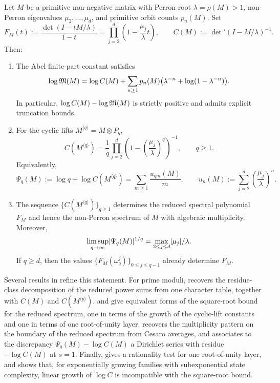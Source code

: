 \begin{theorem}\label{thm:intro-finite-part-fingerprint}
Let \(M\) be a primitive non-negative matrix with Perron root
\(\lambda=\rho(M)>1\), non-Perron eigenvalues
\(\mu_2,\dots,\mu_d\), and primitive orbit counts \(p_n(M)\). Set
\[
  F_M(t):=\frac{\det(I-tM/\lambda)}{1-t}
  =\prod_{j=2}^d\left(1-\frac{\mu_j}{\lambda}t\right),
  \qquad
  C(M):=\det\nolimits'(I-M/\lambda)^{-1}.
\]
Then:
\begin{enumerate}[label=\textup{(\roman*)}]
  \item The Abel finite-part constant satisfies
  \[
    \log\mathfrak{M}(M)
    =\log C(M)
     +\sum_{n\ge 1}p_n(M)\bigl(\lambda^{-n}+\log(1-\lambda^{-n})\bigr).
  \]
  In particular, \(\log C(M)-\log\mathfrak{M}(M)\) is strictly positive and
  admits explicit truncation bounds.

  \item For the cyclic lifts \(M^{\langle q\rangle}=M\otimes P_q\),
  \[
    C(M^{\langle q\rangle})
    =\frac{1}{q}\prod_{j=2}^d
      \left(1-\left(\frac{\mu_j}{\lambda}\right)^q\right)^{-1},
    \qquad q\ge 1.
  \]
  Equivalently,
  \[
    \Psi_q(M):=\log q+\log C(M^{\langle q\rangle})
    =\sum_{m\ge 1}\frac{u_{qm}(M)}{m},
    \qquad
    u_n(M):=\sum_{j=2}^d\left(\frac{\mu_j}{\lambda}\right)^n.
  \]

  \item The sequence \(\{C(M^{\langle q\rangle})\}_{q\ge 1}\)
  determines the reduced spectral polynomial \(F_M\) and hence the
  non-Perron spectrum of \(M\) with algebraic multiplicity. Moreover,
  \[
    \limsup_{q\to\infty}\lvert \Psi_q(M) \rvert^{1/q}
    =\max_{2\le j\le d}\lvert \mu_j \rvert/\lambda.
  \]
  If \(q\ge d\), then the values
  \(\{F_M(\omega_q^j)\}_{0\le j\le q-1}\) already determine \(F_M\).
\end{enumerate}
\end{theorem}

Several results in  refine this statement. For
prime moduli,
 recovers the
residue-class decomposition of the reduced power sums from one
character table, together with \(C(M)\) and \(C(M^{\langle p\rangle})\).
 and
 give equivalent
forms of the square-root bound for the reduced spectrum, one in terms
of the growth of the cyclic-lift constants and one in terms of one
root-of-unity layer. 
recovers the multiplicity pattern on the boundary of the reduced
spectrum from Cesaro averages, and
 associates to
the discrepancy \(\Psi_q(M)-\log C(M)\) a Dirichlet series with residue
\(-\log C(M)\) at \(s=1\). Finally,
 gives a
rationality test for one root-of-unity layer, and
 shows that, for
exponentially growing families with subexponential state complexity,
linear growth of \(\log C\) is incompatible with the square-root bound.

